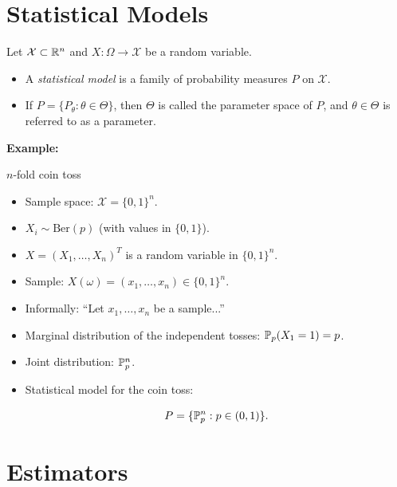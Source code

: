 \section{Statistical Models}

Let \(\mathcal{X} \subset \mathbb{R}^{n}\) and \(X : \Omega \to \mathcal{X}\) be a random variable.

\begin{itemize}

    \item A \emph{statistical model} is a family of probability measures \(P\) on \(\mathcal{X}\).

    \item If \(P = \{ P_{\theta} : \theta \in \Theta \}\), then \(\Theta\) is called the parameter space of \(P\), and \(\theta \in \Theta\) is referred to as a parameter.

\end{itemize}

\textbf{Example:}

\(n\)-fold coin toss  

\begin{itemize}

    \item Sample space: \(\mathcal{X} = \{0,1\}^{n}\).

    \item \(X_{i} \sim \mathrm{Ber}(p)\) (with values in \(\{0,1\}\)).

    \item \(X = (X_{1}, \ldots, X_{n})^{T}\) is a random variable in \(\{0,1\}^{n}\).

    \item Sample: \(X(\omega) = (x_{1}, \ldots, x_{n}) \in \{0,1\}^{n}\).

    \item Informally: “Let \(x_{1}, \ldots, x_{n}\) be a sample...”

    \item Marginal distribution of the independent tosses: \(\mathbb{P}_{p}(X_{1} = 1) = p\).

    \item Joint distribution: \(\mathbb{P}_{p}^{n}\).

    \item Statistical model for the coin toss:

    \[
        P = \{ \mathbb{P}_{p}^{n} : p \in (0,1) \}.
    \]

\end{itemize}

\section{Estimators}

